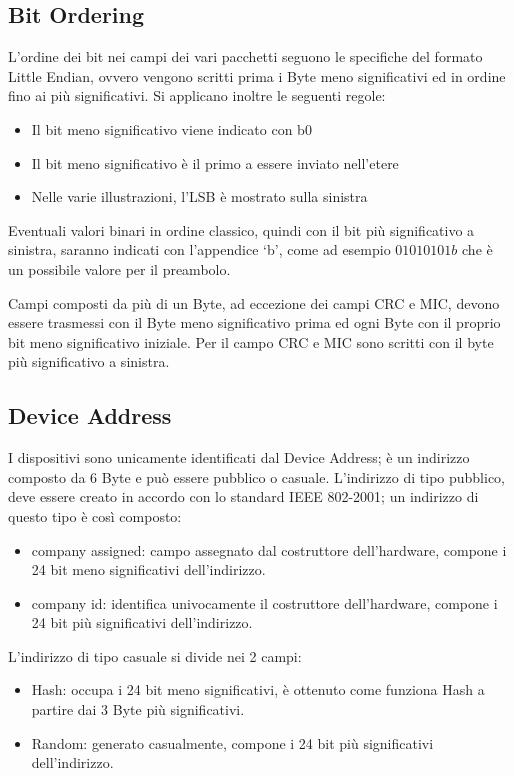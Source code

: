 \subsection{Bit Ordering}\label{endian_bit}
L'ordine dei bit nei campi dei vari pacchetti seguono le specifiche del formato Little Endian, ovvero vengono scritti prima i Byte meno significativi ed in ordine fino ai più significativi. Si applicano inoltre le seguenti regole:

\begin{itemize}
\item Il bit meno significativo viene indicato con b0
\item Il bit meno significativo è il primo a essere inviato nell'etere
\item Nelle varie illustrazioni, l'LSB è mostrato sulla sinistra
\end{itemize}

Eventuali valori binari in ordine classico, quindi con il bit più significativo a sinistra, saranno indicati con l'appendice \lq b\rq, come ad esempio $01010101b$ che è un possibile valore per il preambolo.

Campi composti da più di un Byte, ad eccezione dei campi CRC e MIC, devono essere trasmessi con il Byte meno significativo prima ed ogni Byte con il proprio bit meno significativo iniziale.
Per il campo CRC e MIC sono scritti con il byte più significativo a sinistra.

\subsection{Device Address}
I dispositivi sono unicamente identificati dal Device Address; è un indirizzo composto da 6 Byte e può essere pubblico o casuale.
L'indirizzo di tipo pubblico, deve essere creato in accordo con lo standard IEEE 802-2001; un indirizzo di questo tipo è così composto:
\begin{itemize}
\item company assigned: campo assegnato dal costruttore dell'hardware, compone i 24 bit meno significativi dell'indirizzo.
\item company id: identifica univocamente il costruttore dell'hardware, compone i 24 bit più significativi dell'indirizzo.
\end{itemize}
L'indirizzo di tipo casuale si divide nei 2 campi:
\begin{itemize}
\item Hash: occupa i 24 bit meno significativi, è ottenuto come funziona Hash a partire dai 3 Byte più significativi.
\item Random: generato casualmente, compone i 24 bit più significativi dell'indirizzo.
\end{itemize}



